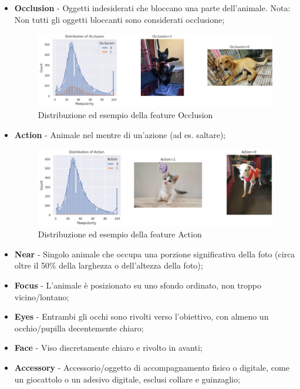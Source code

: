     \begin{itemize}
        \item \textbf{Occlusion} - Oggetti indesiderati che bloccano una parte dell'animale. Nota: Non tutti gli oggetti bloccanti sono considerati occlusione;
        \begin{figure}[H]
            \centering
            \includegraphics[scale=0.5]{Plot/distribution_occlusion.jpg}
            \caption{Distribuzione ed esempio della feature Occlusion}
            \label{fig:occlusion}
        \end{figure}
        \item \textbf{Action} - Animale nel mentre di un'azione (ad es. saltare);
        \begin{figure}[H]
            \centering
            \includegraphics[scale=0.5]{Plot/distribution_action.jpg}
            \caption{Distribuzione ed esempio della feature Action}
            \label{fig:action}
        \end{figure}
        \item \textbf{Near} - Singolo animale che occupa una porzione significativa della foto (circa oltre il 50\% della larghezza o dell'altezza della foto);
        \item \textbf{Focus} - L'animale è posizionato su uno sfondo ordinato, non troppo vicino/lontano;
        \item \textbf{Eyes} - Entrambi gli occhi sono rivolti verso l'obiettivo, con almeno un occhio/pupilla decentemente chiaro;
        \item \textbf{Face} - Viso discretamente chiaro e rivolto in avanti;
        \item \textbf{Accessory} - Accessorio/oggetto di accompagnamento fisico o digitale, come un giocattolo o un adesivo digitale, esclusi collare e guinzaglio;

\end{itemize}
